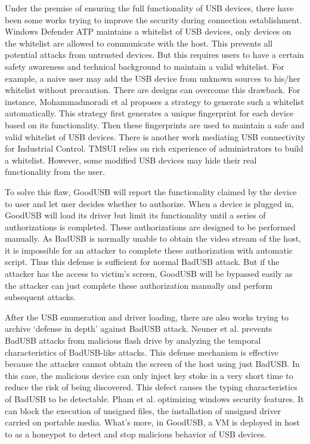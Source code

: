Under the premise of ensuring the full functionality of USB devices, there have been some works trying to improve the security during connection establishment.
Windows Defender ATP\cite{windenfenderwhite} maintains a whitelist of USB devices, only devices on the whitelist are allowed to communicate with the host. This prevents all potential attacks from untrusted devices. But this requires users to have a certain safety awareness and technical background to maintain a valid whitelist. For example, a naive user may add the USB device from unknown sources to his/her whitelist without precaution. There are designs can overcome this drawback. For instance, Mohammadmoradi et al\cite{mohammadmoradi2018making} proposes a strategy to generate such a whitelist automatically. This strategy first generates a unique fingerprint for each device based on its functionality. Then these fingerprints are used to maintain a safe and valid whitelist of USB devices. There is another work mediating USB connectivity for Industrial Control. TMSUI\cite{yang2015tmsui} relies on rich experience of administrators to build a whitelist. However, some modified USB devices may hide their real functionality from the user.

To solve this flaw, GoodUSB\cite{tian2015defending} will report the functionality claimed by the device to user and let user decides whether to authorize. When a device is plugged in, GoodUSB will load its driver but limit its functionality until a series of authorizations is completed. These authorizations are designed to be performed manually. As BadUSB is normally unable to obtain the video stream of the host, it is impossible for an attacker to complete these authorization with automatic script. Thus this defense is sufficient for normal BadUSB attack. But if the attacker has the access to victim's screen, GoodUSB will be bypassed easily as the attacker can just complete these authorization manually and perform subsequent attacks.

After the USB enumeration and driver loading, there are also works trying to archive `defense in depth' against BadUSB attack.
Neuner et al.\cite{neuner2018usblock} prevents BadUSB attacks from malicious flash drive by analyzing the temporal characteristics of BadUSB-like attacks. This defense mechanism is effective because the attacker cannot obtain the screen of the host using just BadUSB. In this case, the malicious device can only inject key stoke in a very short time to reduce the risk of being discovered. This defect causes the typing characteristics of BadUSB to be detectable.  Pham et al. \cite{pham2010optimizing} optimizing windows security features. It can block the execution of unsigned files, the installation of unsigned driver carried on portable media. What's more, in GoodUSB, a VM is deployed in host to as a honeypot to detect and stop malicious behavior of USB devices.

